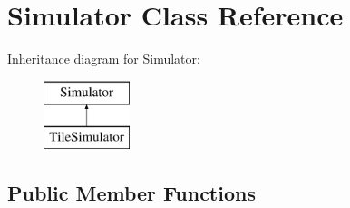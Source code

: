 \hypertarget{classSimulator}{\section{Simulator Class Reference}
\label{classSimulator}
}
Inheritance diagram for Simulator\-:\begin{figure}[H]
\begin{center}
\leavevmode
\includegraphics[height=2.000000cm]{classSimulator}
\end{center}
\end{figure}
\subsection*{Public Member Functions}
